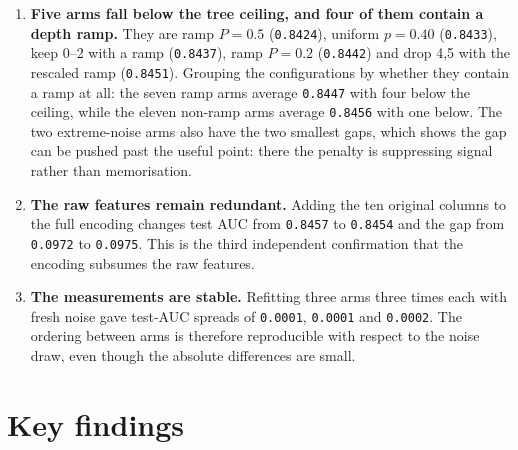 \documentclass[11pt,a4paper]{article}
\newcommand{\num}[1]{\texttt{#1}}
\begin{document}
\begin{enumerate}
\item \textbf{Five arms fall below the tree ceiling, and four of them contain a
depth ramp.} They are ramp $P=0.5$ (\num{0.8424}), uniform $p=0.40$
(\num{0.8433}), keep 0--2 with a ramp (\num{0.8437}), ramp $P=0.2$
(\num{0.8442}) and drop 4,5 with the rescaled ramp (\num{0.8451}). Grouping the
configurations by whether they contain a ramp at all: the seven ramp arms
average \num{0.8447} with four below the ceiling, while the eleven non-ramp
arms average \num{0.8456} with one below. The two extreme-noise arms also have
the two smallest gaps, which shows the gap can be pushed past the useful point:
there the penalty is suppressing signal rather than memorisation.

\item \textbf{The raw features remain redundant.} Adding the ten original
columns to the full encoding changes test AUC from \num{0.8457} to \num{0.8454}
and the gap from \num{0.0972} to \num{0.0975}. This is the third independent
confirmation that the encoding subsumes the raw features.

\item \textbf{The measurements are stable.} Refitting three arms three times
each with fresh noise gave test-AUC spreads of \num{0.0001},
\num{0.0001} and \num{0.0002}. The ordering between arms is therefore
reproducible with respect to the noise draw, even though the absolute
differences are small.

\end{enumerate}

\section{Key findings}
\end{document}

